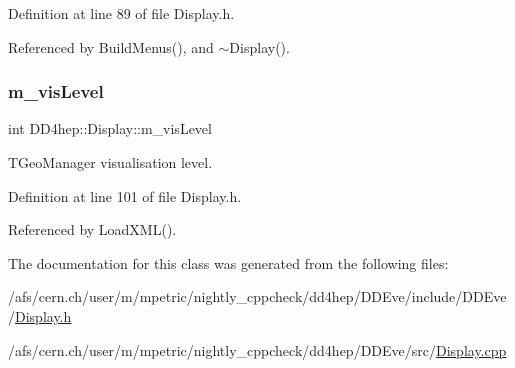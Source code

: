 Definition at line 89 of file Display.\+h.



Referenced by Build\+Menus(), and $\sim$\+Display().

\hypertarget{class_d_d4hep_1_1_display_a1e2bb859df3df7dc1bbc6447094e8f66}{}\label{class_d_d4hep_1_1_display_a1e2bb859df3df7dc1bbc6447094e8f66} 
\subsubsection{\texorpdfstring{m\+\_\+vis\+Level}{m\_visLevel}}
{\footnotesize\ttfamily int D\+D4hep\+::\+Display\+::m\+\_\+vis\+Level\hspace{0.3cm}{\ttfamily [protected]}}



T\+Geo\+Manager visualisation level. 



Definition at line 101 of file Display.\+h.



Referenced by Load\+X\+M\+L().



The documentation for this class was generated from the following files\+:\begin{DoxyCompactItemize}
\item 
/afs/cern.\+ch/user/m/mpetric/nightly\+\_\+cppcheck/dd4hep/\+D\+D\+Eve/include/\+D\+D\+Eve/\hyperlink{_display_8h}{Display.\+h}\item 
/afs/cern.\+ch/user/m/mpetric/nightly\+\_\+cppcheck/dd4hep/\+D\+D\+Eve/src/\hyperlink{_display_8cpp}{Display.\+cpp}\end{DoxyCompactItemize}
